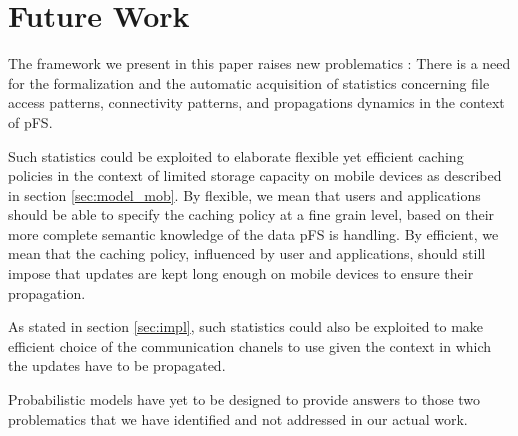
\section{Future Work}
\label{sec:futwk}

The framework we present in this paper raises new problematics : There
is a need for the formalization and the automatic acquisition of
statistics concerning file access patterns, connectivity patterns, and
propagations dynamics in the context of pFS.

Such statistics could be exploited to elaborate flexible yet efficient
caching policies in the context of limited storage capacity on mobile
devices as described in section \ref{sec:model_mob}. By flexible, we mean
that users and applications should be able to specify the caching
policy at a fine grain level, based on their more complete semantic
knowledge of the data pFS is handling. By efficient, we mean that the
caching policy, influenced by user and applications, should still
impose that updates are kept long enough on mobile devices to ensure
their propagation.

As stated in section \ref{sec:impl}, such statistics could also be
exploited to make efficient choice of the communication chanels to
use given the context in which the updates have to be propagated.

Probabilistic models have yet to be designed to provide answers to
those two problematics that we have identified and not addressed in
our actual work.


